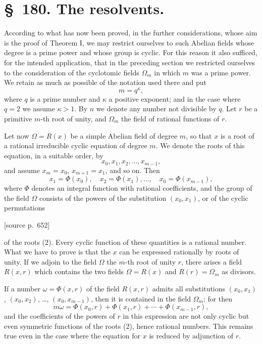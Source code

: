 \documentclass[11pt]{article}
\newcommand{\Om}{\Omega}
\newcommand{\srcpage}[1]{\par\medskip\noindent\textsf{[source p.~#1]}\par\smallskip}
\begin{document}
\section*{\S~180. The resolvents.}

According to what has now been proved, in the further considerations, whose aim is the proof of Theorem I, we may restrict ourselves to such Abelian fields whose degree is a prime power and whose group is cyclic. For this reason it also sufficed, for the intended application, that in the preceding section we restricted ourselves to the consideration of the cyclotomic fields $\Omega_m$ in which $m$ was a prime power. We retain as much as possible of the notation used there and put
\begin{equation}
  m=q^\kappa,
\tag{1}
\end{equation}
where $q$ is a prime number and $\kappa$ a positive exponent; and in the case where $q=2$ we assume $\kappa>1$. By $n$ we denote any number not divisible by $q$. Let $r$ be a primitive $m$-th root of unity, and $\Omega_m$ the field of rational functions of $r$.

Let now $\Om=R(x)$ be a simple Abelian field of degree $m$, so that $x$ is a root of a rational irreducible cyclic equation of degree $m$. We denote the roots of this equation, in a suitable order, by
\begin{equation}
  x_0,x_1,x_2,\ldots,x_{m-1},
\tag{2}
\end{equation}
and assume $x_m=x_0$, $x_{m+1}=x_1$, and so on. Then
\[
  x_1=\Phi(x_0),\quad x_2=\Phi(x_1),\ldots,\quad x_0=\Phi(x_{m-1}),
\]
where $\Phi$ denotes an integral function with rational coefficients, and the group of the field $\Om$ consists of the powers of the substitution $(x_0,x_1)$, or of the cyclic permutations

\srcpage{652}
of the roots (2). Every cyclic function of these quantities is a rational number. What we have to prove is that the $x$ can be expressed rationally by roots of unity. If we adjoin to the field $\Om$ the $m$-th root of unity $r$, there arises a field $R(x,r)$ which contains the two fields $\Om=R(x)$ and $R(r)=\Omega_m$ as divisors.

If a number $\omega=\Phi(x,r)$ of the field $R(x,r)$ admits all substitutions $(x_0,x_1)$, $(x_0,x_2)$, \ldots, $(x_0,x_{m-1})$, then it is contained in the field $\Omega_m$; for then
\[
  m\omega=\Phi(x_0,r)+\Phi(x_1,r)+\cdots+\Phi(x_{m-1},r),
\]
and the coefficients of the powers of $r$ in this expression are not only cyclic but even symmetric functions of the roots (2), hence rational numbers. This remains true even in the case where the equation for $x$ is reduced by adjunction of $r$.
\end{document}
